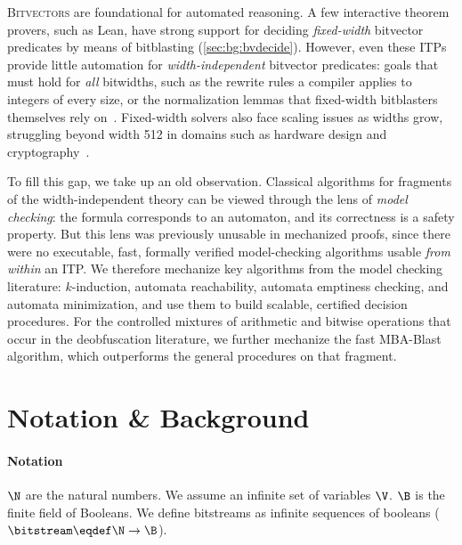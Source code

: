 \lettrine{B}{itvectors} are foundational for automated reasoning. A few
interactive theorem provers, such as Lean, have strong support for deciding
\emph{fixed-width} bitvector predicates by means of bitblasting
(\cref{sec:bg:bvdecide}). However, even these ITPs provide little automation
for \emph{width-independent} bitvector predicates: goals that must hold for
\emph{all} bitwidths, such as the rewrite rules a compiler applies to
integers of every size, or the normalization lemmas that fixed-width
bitblasters themselves rely on~\citep{niemetz2024scalable}. Fixed-width
solvers also face scaling issues as widths grow, struggling beyond width 512
in domains such as hardware design and
cryptography~\citep{lopes2018future,hydra}.

To fill this gap, we take up an old observation. Classical algorithms for
fragments of the width-independent theory can be viewed through the lens of
\emph{model checking}: the formula corresponds to an automaton, and its
correctness is a safety property. But this lens was previously unusable in
mechanized proofs, since there were no executable, fast, formally verified
model-checking algorithms usable \emph{from within} an ITP. We therefore
mechanize key algorithms from the model checking literature: $k$-induction,
automata reachability, automata emptiness checking, and automata
minimization, and use them to build scalable, certified decision procedures.
For the controlled mixtures of arithmetic and bitwise operations that occur in
the deobfuscation literature, we further mechanize the fast MBA-Blast
algorithm, which outperforms the general procedures on that fragment.

\section{Notation \& Background}
\label{sec:swbv:background}

\paragraph{Notation} $\N$ are the natural numbers. We assume an infinite set of variables $\V$.
$\B$ is the finite field of Booleans.
%
We define bitstreams as infinite sequences of booleans ($\bitstream \eqdef \N
\to \B$).

